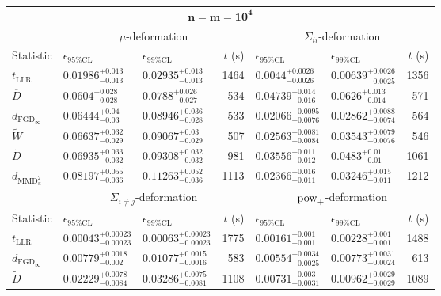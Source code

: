 \begin{tabular}{l|llr|llr}
	\toprule
	\multicolumn{7}{c}{$\mathbf{n=m=10^{4}}$} \\
	\multicolumn{1}{c}{} & \multicolumn{3}{c}{$\mu$-deformation} & \multicolumn{3}{c}{$\Sigma_{ii}$-deformation} \\
	Statistic & $\epsilon_{95\%\mathrm{CL}}$ & $\epsilon_{99\%\mathrm{CL}}$ & $t$ (s) & $\epsilon_{95\%\mathrm{CL}}$ & $\epsilon_{99\%\mathrm{CL}}$ & $t$ (s) \\
	\midrule
	$t_{\mathrm{LLR}}$ & $0.01986_{-0.013}^{+0.013}$ & $0.02935_{-0.013}^{+0.013}$ & 1464 & $0.0044_{-0.0026}^{+0.0026}$ & $0.00639_{-0.0025}^{+0.0026}$ & 1356 \\
	$\overline{D}$ & $0.0604_{-0.028}^{+0.028}$ & $0.0788_{-0.027}^{+0.026}$ & 534 & $0.04739_{-0.016}^{+0.014}$ & $0.0626_{-0.014}^{+0.013}$ & 571 \\
	$d_{\mathrm{FGD}_{\infty}}$ & $0.06444_{-0.03}^{+0.04}$ & $0.08946_{-0.028}^{+0.036}$ & 533 & $0.02066_{-0.0076}^{+0.0095}$ & $0.02862_{-0.0074}^{+0.0088}$ & 564 \\
	$\widetilde{W}$ & $0.06637_{-0.029}^{+0.032}$ & $0.09067_{-0.029}^{+0.03}$ & 507 & $0.02563_{-0.0084}^{+0.0081}$ & $0.03543_{-0.0076}^{+0.0079}$ & 546 \\
	$\widetilde{D}$ & $0.06935_{-0.032}^{+0.033}$ & $0.09308_{-0.032}^{+0.032}$ & 981 & $0.03556_{-0.012}^{+0.011}$ & $0.0483_{-0.01}^{+0.01}$ & 1061 \\
	$d_{\mathrm{MMD}^{2}_{u}}$ & $0.08197_{-0.036}^{+0.055}$ & $0.11263_{-0.036}^{+0.052}$ & 1113 & $0.02366_{-0.011}^{+0.016}$ & $0.03246_{-0.011}^{+0.015}$ & 1212 \\
	\toprule
	\multicolumn{1}{c}{} & \multicolumn{3}{c}{$\Sigma_{i\neq j}$-deformation} & \multicolumn{3}{c}{$\rm{pow}_{+}$-deformation} \\
	Statistic & $\epsilon_{95\%\mathrm{CL}}$ & $\epsilon_{99\%\mathrm{CL}}$ & $t$ (s) & $\epsilon_{95\%\mathrm{CL}}$ & $\epsilon_{99\%\mathrm{CL}}$ & $t$ (s) \\
	\midrule
	$t_{\mathrm{LLR}}$ & $0.00043_{-0.00023}^{+0.00023}$ & $0.00063_{-0.00023}^{+0.00023}$ & 1775 & $0.00161_{-0.001}^{+0.001}$ & $0.00228_{-0.001}^{+0.001}$ & 1488 \\
	$d_{\mathrm{FGD}_{\infty}}$ & $0.00779_{-0.002}^{+0.0018}$ & $0.01077_{-0.0016}^{+0.0015}$ & 583 & $0.00554_{-0.0025}^{+0.0034}$ & $0.00773_{-0.0024}^{+0.0031}$ & 613 \\
	$\widetilde{D}$ & $0.02229_{-0.0084}^{+0.0078}$ & $0.03286_{-0.0081}^{+0.0075}$ & 1108 & $0.00731_{-0.0031}^{+0.003}$ & $0.00962_{-0.0029}^{+0.0029}$ & 1089 \\

\end{tabular}
